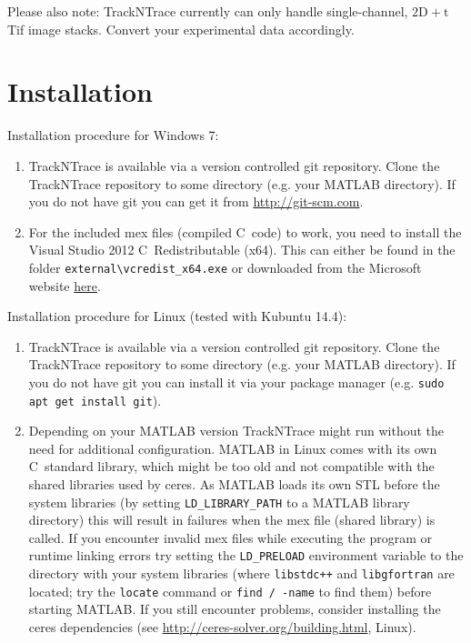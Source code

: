 \documentclass[11pt,onside]{report}
\numberwithin{equation}{chapter}
\def\CC{{C\nolinebreak[4]\hspace{-.05em}\raisebox{.4ex}{\tiny\bf ++}}}
\begin{document}
Please also note: TrackNTrace currently can only handle single-channel, $\mathrm{2D}+\mathrm{t}$ Tif image stacks. Convert your experimental data accordingly. \clearpage%

\tableofcontents

\section{Installation}\label{sec:install}
Installation procedure for Windows 7:
\begin{enumerate}
\item TrackNTrace is available via a version controlled git repository. Clone the TrackNTrace repository to some directory (e.g. your MATLAB directory). If you do not have git you can get it from \url{http://git-scm.com}.
\item For the included mex files (compiled \CC~code) to work, you need to install the Visual Studio 2012 \CC~Redistributable (x64). This can either be found in the folder \texttt{external\textbackslash{}vcredist\_x64.exe} or downloaded from the Microsoft website \href{https://www.microsoft.com/en-us/download/details.aspx?id=30679}{here}.
\end{enumerate}

Installation procedure for Linux (tested with Kubuntu 14.4):
\begin{enumerate}
\item TrackNTrace is available via a version controlled git repository. Clone the TrackNTrace repository to some directory (e.g. your MATLAB directory). If you do not have git you can install it via your package manager (e.g. \texttt{sudo apt get install git}).
\item Depending on your MATLAB version TrackNTrace might run without the need for additional configuration.
MATLAB in Linux comes with its own \CC~standard library, which might be too old and not compatible with the shared libraries used by ceres. As MATLAB loads its own STL before the system libraries (by setting \texttt{LD\_LIBRARY\_PATH} to a MATLAB library directory) this will result  in failures when the mex file (shared library) is called. If you encounter invalid mex files while executing the program or runtime linking errors try setting the \texttt{LD\_PRELOAD} environment variable to the directory with your system libraries (where \texttt{libstdc++} and \texttt{libgfortran} are located; try the \texttt{locate} command or \texttt{find / -name} to find them) before starting MATLAB. If you still encounter problems, consider installing the ceres dependencies (see \url{http://ceres-solver.org/building.html}, Linux).
\end{enumerate}
\end{document}
